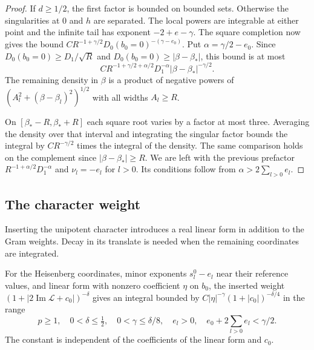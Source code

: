 \begin{proof}
If \(d\ge1/2\), the
first factor is bounded on bounded sets. Otherwise
the singularities at \(0\) and \(h\) are separated.
The local powers are integrable at either point and the
infinite tail has exponent \(-2+e-\gamma\).
The square completion now gives the bound
\(C R^{-1+\gamma/2}D_0(b_0=0)^{-(\gamma-e_0)}\).
Put \(\alpha=\gamma/2-e_0\). Since \(D_0(b_0=0)\ge
D_1/\sqrt R\) and \(D_0(b_0=0)\ge|\beta-\beta_*|\),
this bound is at most
\[
 C R^{-1+\gamma/2+\alpha/2}
                  D_1^{-\alpha}|\beta-\beta_*|^{-\gamma/2}.
\]
The remaining density in \(\beta\) is a product of
negative powers of \((A_l^2+(\beta-\beta_l)^2)^{1/2}\)
with all widths \(A_l\ge R\).

On
\([\beta_*-R,\beta_*+R]\) each square root varies by a
factor at most three. Averaging the density over that
interval and integrating the singular factor bounds the
integral by \(C R^{-\gamma/2}\) times the integral of the
density. The same comparison holds on the complement
since \(|\beta-\beta_*|\ge R\). We are left with the
previous prefactor \(R^{-1+\alpha/2}D_1^{-\alpha}\)
and \(\nu_l=-e_l\) for \(l>0\). Its conditions follow
from \(\alpha>2\sum_{l>0}e_l\).

\end{proof}

\subsection{The character weight}

Inserting the unipotent character introduces a real linear form in addition to the Gram weights. Decay in its translate is needed when the remaining coordinates are integrated.

\begin{proposition}\label{prop:heisenberg-character}
For the Heisenberg coordinates, minor exponents \(s_l^0-e_l\)
near their reference values, and linear form with nonzero
coefficient \(\eta\) on \(b_0\), the inserted weight
\((1+|2\operatorname{Im}\mathcal L+c_0|)^{-\delta}\)
gives an integral bounded by
\(C|\eta|^{-\gamma}(1+|c_0|)^{-\delta/4}\) in the range 
\[
 p\ge1,\quad 0<\delta\le\tfrac12,\quad 0<\gamma\le\delta/8,\quad e_l>0,\quad e_0+2\sum_{l>0}e_l<\gamma/2.
\]
 The constant
is independent of the coefficients of the linear form and \(c_0\).
\end{proposition}

